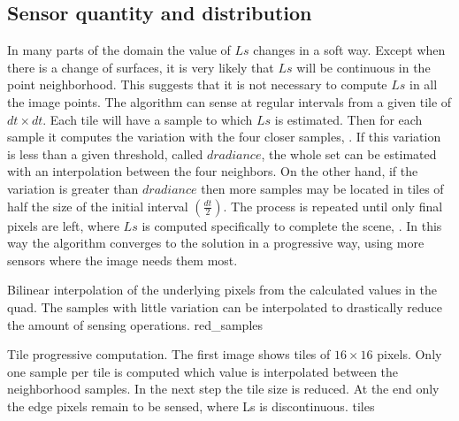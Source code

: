 \documentclass[10pt, conference]{IEEEtran}
\begin{document}
\subsection{Sensor quantity and distribution}
In many parts of the domain the value of $Ls$ changes in a soft way. 
Except when there is a change of surfaces, it is very likely that $Ls$ will be continuous in the point neighborhood. 
This suggests that it is not necessary to compute $Ls$ in all the image points. 
The algorithm can sense at regular intervals from a given tile of $dt \times dt$. 
Each tile will have a sample to which $Ls$ is estimated. Then for each sample it computes the variation with the four closer samples, . 
If this variation is less than a given threshold, called $dradiance$, the whole set can be estimated with an interpolation between the four neighbors. 
On the other hand, if the variation is greater than $dradiance$ then more samples may be located in tiles of half the size of the initial interval $(\frac{dt}{2})$. 
The process is repeated until only final pixels are left, where $Ls$ is computed specifically to complete the scene, .
In this way the algorithm converges to the solution in a progressive way, using more sensors where the image needs them most.\

\subimages
	{Bilinear interpolation of the underlying pixels from the calculated values in the quad. 
	The samples with little variation can be interpolated to drastically reduce the amount of sensing operations.}
	{red_samples}{
}

\subimages
	{Tile progressive computation. The first image shows tiles of $16 \times 16$ pixels. 
	Only one sample per tile is computed which value is interpolated between the neighborhood samples. 
	In the next step the tile size is reduced. At the end only the edge pixels remain to be sensed, where Ls is discontinuous.}
	{tiles}{
}


\end{document}
